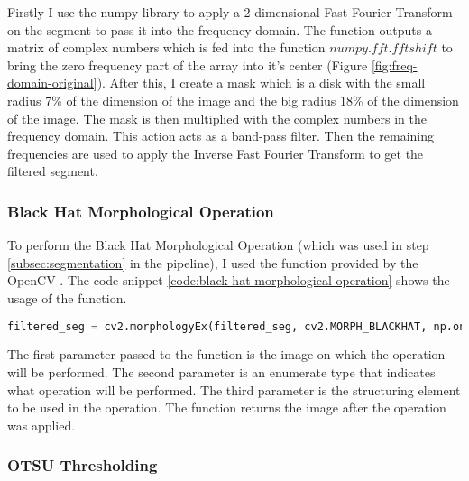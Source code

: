 Firstly I use the numpy library to apply a 2 dimensional Fast Fourier Transform on the segment to pass it into the frequency domain. The function outputs a matrix of complex numbers which is fed into the function $numpy.fft.fftshift$ to bring the zero frequency part of the array into it's center (Figure \ref{fig:freq-domain-original}). After this, I create a mask which is a disk with the small radius 7\% of the dimension of the image and the big radius 18\% of the dimension of the image. The mask is then multiplied with the complex numbers in the frequency domain. This action acts as a band-pass filter. Then the remaining frequencies are used to apply the Inverse Fast Fourier Transform to get the filtered segment.

\subsubsection{Black Hat Morphological Operation}

To perform the Black Hat Morphological Operation (which was used in step \ref{subsec:segmentation} in the pipeline), I used the function provided by the OpenCV \cite{site:opencv-morphological-ops}. The code snippet \ref{code:black-hat-morphological-operation} shows the usage of the function.

\begin{lstlisting}[language=Python, label=code:black-hat-morphological-operation, caption={Black Hat Morphological Operation}]
    filtered_seg = cv2.morphologyEx(filtered_seg, cv2.MORPH_BLACKHAT, np.ones((3,3), np.uint8))
\end{lstlisting}

The first parameter passed to the function is the image on which the operation will be performed. The second parameter is an enumerate type that indicates what operation will be performed. The third parameter is the structuring element to be used in the operation. The function returns the image after the operation was applied.

\subsubsection{OTSU Thresholding}

